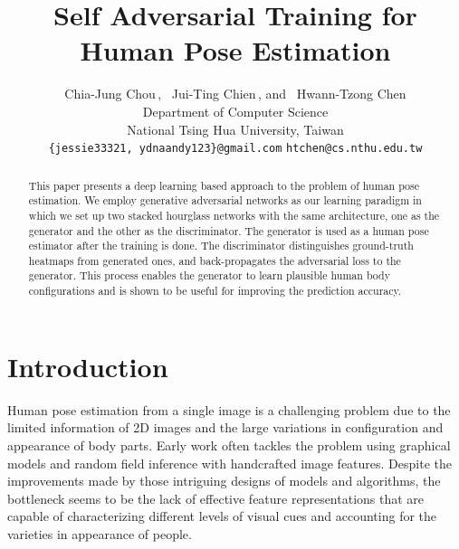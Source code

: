 \documentclass[10pt,twocolumn,letterpaper]{article}
\begin{document}
\title{Self Adversarial Training for Human Pose Estimation}

\author{Chia-Jung Chou\,, \, Jui-Ting Chien\,, and \, Hwann-Tzong Chen\\
Department of Computer Science\\
National Tsing Hua University, Taiwan\\
{\tt\small \{jessie33321, ydnaandy123\}@gmail.com}
\qquad
{\tt\small htchen@cs.nthu.edu.tw}
}



\maketitle





\begin{abstract}
This paper presents a deep learning based approach to the problem of human pose estimation. We employ generative adversarial networks as our learning paradigm in which we set up two stacked hourglass networks with the same architecture, one as the generator and the other as the discriminator. The generator is used as a human pose estimator after the training is done. The discriminator distinguishes ground-truth heatmaps from generated ones, and back-propagates the adversarial loss to the generator. This process enables the generator to learn plausible human body configurations and is shown to be useful for improving the prediction accuracy. 
\end{abstract}

\section{Introduction}

Human pose estimation from a single image is a challenging problem due to the limited information of 2D images and the large variations in configuration and appearance of body parts. Early work often tackles the problem using graphical models \cite{AndrilukaRS09,FelzenszwalbMR08,JohnsonE11} and random field inference \cite{LadickyTZ13,RamakrishnaMHBS14} with handcrafted image features. Despite the improvements made by those intriguing designs of models and algorithms, the bottleneck seems to be the lack of effective feature representations that are capable of characterizing different levels of visual cues and accounting for the varieties in appearance of people. 
\end{document}
